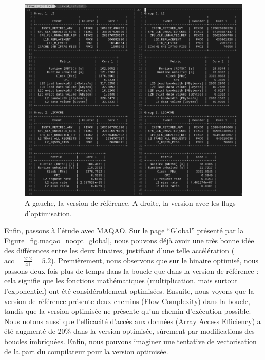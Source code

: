 \documentclass[12pt,a4paper]{article}
\begin{document}
\begin{figure}[h]
    \centering
    \includegraphics[scale=0.45]{./figures/L1/likwid_noopt.png}
    \caption{A gauche, la version de référence. A droite, la version avec les
    flags d'optimisation.}
    \label{fig.likwid_noopt}
\end{figure}

Enfin, passons à l'étude avec MAQAO. Sur le page \enquote{Global} présenté par
la Figure~\ref{fig.maqao_noopt_global}, nous pouvons déjà avoir une très bonne
idée des différences entre les deux binaires, justifiant d'une telle
accélération ($\text{acc} = \frac{212}{41} = 5.2$). Premièrement, nous observons
que sur le binaire optimisé, nous passons deux fois plus de temps dans la boucle
que dans la version de référence : cela signifie que les fonctions
mathématiques (multiplication, mais surtout l'exponentiel) ont été
considérablement optimisées. Ensuite, nous voyons que la version de référence
présente deux chemins (Flow Complexity) dans la boucle, tandis que la version
optimisée ne présente qu'un chemin d'exécution possible. Nous notons aussi que
l'efficacité d'accès aux données (Array Access Efficiency) a été augmenté de
20\% dans la version optimisée, sûrement par modifications des boucles
imbriquées. Enfin, nous pouvons imaginer une tentative de vectorisation de la
part du compilateur pour la version optimisée.
\end{document}
